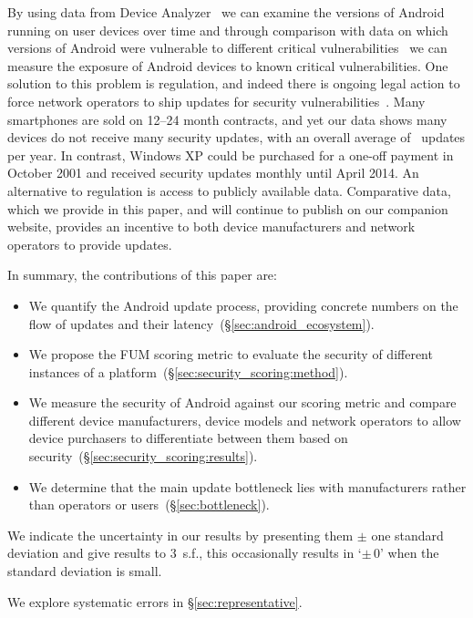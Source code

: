 \documentclass{sig-alternate-2013}
\let\OldTodo\todo
\renewcommand{\todo}{\OldTodo[inline]}
\newcommand{\todolater}[1]{}%
\newcommand{\da}{Device Analyzer}
\begin{document}
By using data from \da~\cite{Wagner2013} we can examine the versions of Android running on user devices over time and through comparison with data on which versions of Android were vulnerable to different critical vulnerabilities~\cite{androidvulnerabilities.org} we can measure the exposure of Android devices to known critical vulnerabilities.
One solution to this problem is regulation, and indeed there is ongoing legal action to force network operators to ship updates for security vulnerabilities~\cite{Soghoian2013}.\todolater{Check on the status of this legal action}
Many smartphones are sold on 12--24 month contracts, and yet our data shows many devices do not receive many security updates, with an overall average of \daUpdatesPerYearNominal\ updates per year. 
In contrast, Windows XP could be purchased for a one-off payment in October 2001 and received security updates monthly until April 2014.
An alternative to regulation is access to publicly available data.
Comparative data, which we provide in this paper, and will continue to publish on our companion website, provides an incentive to both device manufacturers and network operators to provide updates.

In summary, the contributions of this paper are:
\begin{itemize}
 \item We quantify the Android update process, providing concrete numbers on the flow of updates and their latency~(\S\ref{sec:android_ecosystem}).
 \item We propose the FUM scoring metric to evaluate the security of different instances of a platform~(\S\ref{sec:security_scoring:method}).
 \item We measure the security of Android against our scoring metric and compare different device manufacturers, device models and network operators to allow device purchasers to differentiate between them based on security~(\S\ref{sec:security_scoring:results}).
 \item We determine that the main update bottleneck lies with manufacturers rather than operators or users~(\S\ref{sec:bottleneck}).
\end{itemize}

We indicate the uncertainty in our results by presenting them $\pm$ one standard deviation and give results to 3~s.f., this occasionally results in `$\pm\, 0$' when the standard deviation is small.
\todolater{Do we want to use the 95 percentile instead}
We explore systematic errors in \S\ref{sec:representative}.
\end{document}
